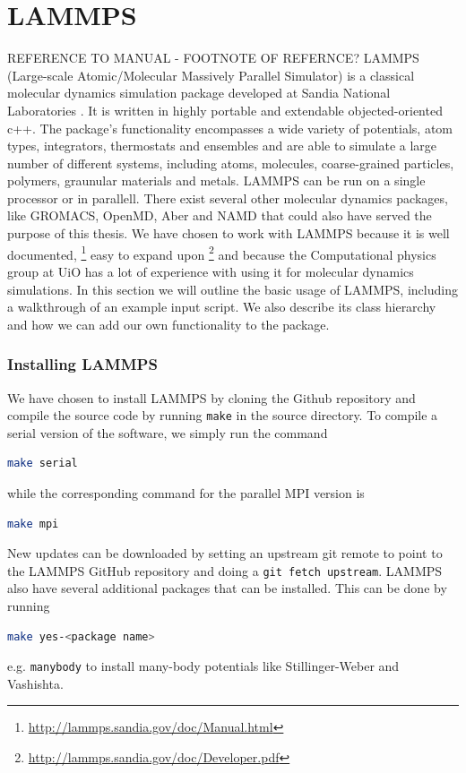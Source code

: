 \documentclass[twoside,english]{uiofysmaster}
\begin{document}
\chapter{LAMMPS}
REFERENCE TO MANUAL - FOOTNOTE OF REFERNCE?
LAMMPS (Large-scale Atomic/Molecular Massively Parallel Simulator)
is a classical molecular dynamics simulation package 
developed at Sandia National Laboratories \cite{Plimpton95}. It is written
in highly portable and extendable objected-oriented c++. 
The package's functionality encompasses a wide variety of 
potentials, atom types, integrators, thermostats and 
ensembles and are able to simulate a large number
of different systems, including atoms, molecules, 
coarse-grained particles, polymers, graunular materials
and metals. LAMMPS can be run on a single processor
or in parallell. 
There exist several other molecular dynamics packages, 
like GROMACS, OpenMD, Aber and NAMD that could also
have served the purpose of this thesis. We have chosen
to work with LAMMPS because it is well documented, 
\footnote{\href{http://lammps.sandia.gov/doc/Manual.html}{http://lammps.sandia.gov/doc/Manual.html}}
easy to expand upon \footnote{\href{http://lammps.sandia.gov/doc/Developer.pdf}{http://lammps.sandia.gov/doc/Developer.pdf}}
and because the Computational
physics group at UiO has a lot of experience with using
it for molecular dynamics simulations. 
In this section we will outline the basic usage of LAMMPS, including
a walkthrough of an example input script. We also describe its
class hierarchy and how we can add our own functionality
to the package.

\subsection{Installing LAMMPS}
We have chosen to install LAMMPS by cloning
the Github repository and compile the source
code by running \texttt{make} in the source directory. 
To compile a serial version of the software, we simply run
the command
\begin{lstlisting}[language=bash]
 make serial
\end{lstlisting}
while the corresponding command for the parallel
MPI version is
\begin{lstlisting}[language=bash]
 make mpi
\end{lstlisting}
New updates can be downloaded by setting an
upstream git remote to point to the LAMMPS
GitHub repository and doing a \texttt{git fetch upstream}. 
LAMMPS also have several additional packages that
can be installed. This can be done by running
\begin{lstlisting}[language=bash]
 make yes-<package name>
\end{lstlisting}
e.g. \texttt{manybody} to install many-body potentials
like Stillinger-Weber and Vashishta. 
\end{document}
